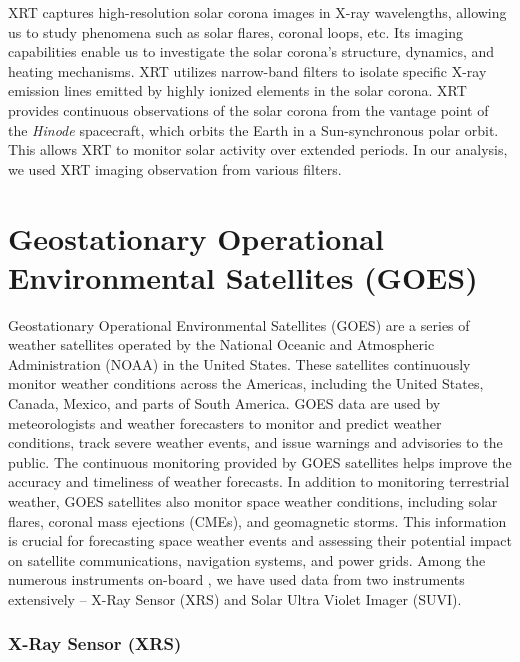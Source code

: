 {XRT captures high-resolution solar corona images in X-ray wavelengths, allowing us to study phenomena such as solar flares, coronal loops, etc. Its imaging capabilities enable us to investigate the solar corona's structure, dynamics, and heating mechanisms. XRT utilizes narrow-band filters to isolate specific X-ray emission lines emitted by highly ionized elements in the solar corona. XRT provides continuous observations of the solar corona from the vantage point of the {\it Hinode} spacecraft, which orbits the Earth in a Sun-synchronous polar orbit. This allows XRT to monitor solar activity over extended periods. In our analysis, we used XRT imaging observation from various filters.

\section{Geostationary Operational Environmental Satellites (GOES)}

Geostationary Operational Environmental Satellites (GOES) are a series of weather satellites operated by the National Oceanic and Atmospheric Administration (NOAA) in the United States. These satellites continuously monitor weather conditions across the Americas, including the United States, Canada, Mexico, and parts of South America. GOES data are used by meteorologists and weather forecasters to monitor and predict weather conditions, track severe weather events, and issue warnings and advisories to the public. The continuous monitoring provided by GOES satellites helps improve the accuracy and timeliness of weather forecasts. In addition to monitoring terrestrial weather, GOES satellites also monitor space weather conditions, including solar flares, coronal mass ejections (CMEs), and geomagnetic storms. This information is crucial for forecasting space weather events and assessing their potential impact on satellite communications, navigation systems, and power grids. Among the numerous instruments on-board {\GOES}, we have used data from two instruments extensively {--} X-Ray Sensor (XRS) and Solar Ultra Violet Imager (SUVI).

\subsubsection{X-Ray Sensor (XRS)}

}
